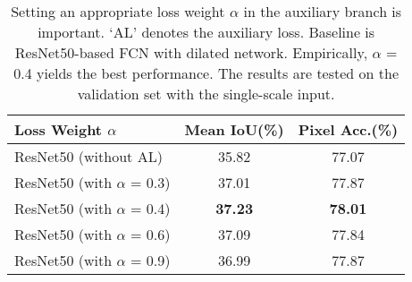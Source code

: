 \documentclass[10pt,twocolumn,letterpaper]{article}
\begin{document}
\begin{table}
\footnotesize
\begin{center}
\begin{tabular}{ l c c}
\hline
Loss Weight $\alpha$ & Mean IoU(\%) & Pixel Acc.(\%) \\
\hline\hline
ResNet50 (without AL) & 35.82 & 77.07 \\
ResNet50 (with $\alpha$ = 0.3) & 37.01 & 77.87 \\
ResNet50 (with $\alpha$ = 0.4) & \textbf{37.23} & \textbf{78.01} \\
ResNet50 (with $\alpha$ = 0.6) & 37.09 & 77.84 \\
ResNet50 (with $\alpha$ = 0.9) & 36.99 & 77.87 \\
\hline
\end{tabular}
\end{center}
\caption{Setting an appropriate loss weight $\alpha$ in the auxiliary branch is
important. `AL' denotes the auxiliary loss. Baseline is ResNet50-based FCN with dilated
network. Empirically, $\alpha$ = 0.4 yields the best performance. The results are tested
on the validation set with the single-scale input.} \label{tab:auxiliaryloss}
\end{table}
\end{document}
